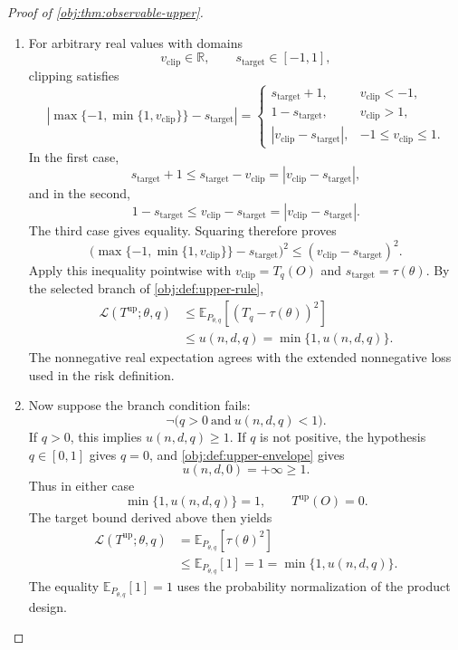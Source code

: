 \documentclass[11pt]{article}
\begin{document}
\begin{proof}[Proof of \cref{obj:thm:observable-upper}]
\begin{enumerate}
\item
For arbitrary real values with domains
\[
v_{\mathrm{clip}}\in\mathbb R,
\qquad
s_{\mathrm{target}}\in[-1,1],
\]
clipping satisfies
\[
\left|\max\{-1,\min\{1,v_{\mathrm{clip}}\}\}
-s_{\mathrm{target}}\right|
=
\begin{cases}
s_{\mathrm{target}}+1,
&v_{\mathrm{clip}}<-1,\\
1-s_{\mathrm{target}},
&v_{\mathrm{clip}}>1,\\
|v_{\mathrm{clip}}-s_{\mathrm{target}}|,
&-1\le v_{\mathrm{clip}}\le1.
\end{cases}
\]
In the first case,
\[
s_{\mathrm{target}}+1
\le s_{\mathrm{target}}-v_{\mathrm{clip}}
=|v_{\mathrm{clip}}-s_{\mathrm{target}}|,
\]
and in the second,
\[
1-s_{\mathrm{target}}
\le v_{\mathrm{clip}}-s_{\mathrm{target}}
=|v_{\mathrm{clip}}-s_{\mathrm{target}}|.
\]
The third case gives equality. Squaring therefore proves
\[
\bigl(\max\{-1,\min\{1,v_{\mathrm{clip}}\}\}
-s_{\mathrm{target}}\bigr)^2
\le
(v_{\mathrm{clip}}-s_{\mathrm{target}})^2.
\]
Apply this inequality pointwise with \(v_{\mathrm{clip}}=T_q(O)\) and \(s_{\mathrm{target}}=\tau(\theta)\). By the selected branch of \cref{obj:def:upper-rule},
\[
\begin{aligned}
\mathcal L(T^{\mathrm{up}};\theta,q)
&\le
\mathbb E_{P_{\theta,q}}
\left[(T_q-\tau(\theta))^2\right]\\
&\le u(n,d,q)
=\min\{1,u(n,d,q)\}.
\end{aligned}
\]
The nonnegative real expectation agrees with the extended nonnegative loss used in the risk definition.

\item
Now suppose the branch condition fails:
\[
\neg\bigl(q>0\ \text{and}\ u(n,d,q)<1\bigr).
\]
If \(q>0\), this implies \(u(n,d,q)\ge1\). If \(q\) is not positive, the hypothesis \(q\in[0,1]\) gives \(q=0\), and \cref{obj:def:upper-envelope} gives
\[
u(n,d,0)=+\infty\ge1.
\]
Thus in either case
\[
\min\{1,u(n,d,q)\}=1,
\qquad
T^{\mathrm{up}}(O)=0.
\]
The target bound derived above then yields
\[
\begin{aligned}
\mathcal L(T^{\mathrm{up}};\theta,q)
&=\mathbb E_{P_{\theta,q}}[\tau(\theta)^2]\\
&\le\mathbb E_{P_{\theta,q}}[1]
=1
=\min\{1,u(n,d,q)\}.
\end{aligned}
\]
The equality \(\mathbb E_{P_{\theta,q}}[1]=1\) uses the probability normalization of the product design.


\end{enumerate}
\end{proof}
\end{document}
